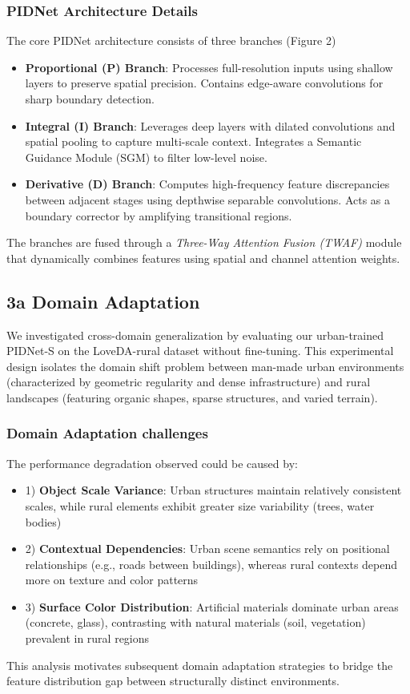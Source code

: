 \documentclass{article}
\begin{document}
\begin{multicols}{2}
\subsubsection{PIDNet Architecture Details}
The core PIDNet architecture \cite{pidnet2023} consists of three branches (Figure 2)
\begin{itemize}
	\item \textbf{Proportional (P) Branch}: Processes full-resolution inputs using shallow layers to preserve spatial precision. Contains edge-aware convolutions for sharp boundary detection.
	\item \textbf{Integral (I) Branch}: Leverages deep layers with dilated convolutions and spatial pooling to capture multi-scale context. Integrates a Semantic Guidance Module (SGM) to filter low-level noise.
	\item \textbf{Derivative (D) Branch}: Computes high-frequency feature discrepancies between adjacent stages using depthwise separable convolutions. Acts as a boundary corrector by amplifying transitional regions.
\end{itemize}
The branches are fused through a \textit{Three-Way Attention Fusion (TWAF)} module that dynamically combines features using spatial and channel attention weights.
 
\subsection{3a Domain Adaptation }
\label{subsec:domain_shift}
We investigated cross-domain generalization by evaluating our urban-trained PIDNet-S on the LoveDA-rural dataset without fine-tuning. This experimental design isolates the domain shift problem between man-made urban environments (characterized by geometric regularity and dense infrastructure) and rural landscapes (featuring organic shapes, sparse structures, and varied terrain).
\\
\subsubsection{Domain Adaptation challenges}
The performance degradation observed could be caused by:  
\begin{itemize}
\item1) \textbf{Object Scale Variance}: Urban structures maintain relatively consistent scales, while rural elements exhibit greater size variability (trees, water bodies)  
\item2) \textbf{Contextual Dependencies}: Urban scene semantics rely on positional relationships (e.g., roads between buildings), whereas rural contexts depend more on texture and color patterns  
\item3) \textbf{Surface Color Distribution}: Artificial materials dominate urban areas (concrete, glass), contrasting with natural materials (soil, vegetation) prevalent in rural regions
\end{itemize}
This analysis motivates subsequent domain adaptation strategies to bridge the feature distribution gap between structurally distinct environments.



\end{multicols}
\end{document}
